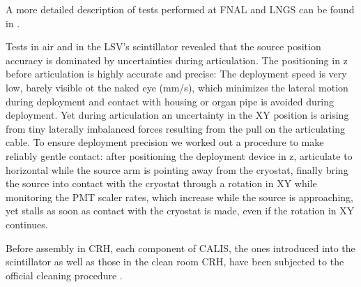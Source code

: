 A more detailed description of tests performed at FNAL and LNGS can be found in \cite{thesis:Hackett, thesis:Edkins}.

Tests in air and in the LSV's scintillator revealed that the source position accuracy is dominated by uncertainties during articulation. The positioning in z before articulation is highly accurate and precise: The deployment speed is very low, barely visible ot the naked eye (mm/s), which minimizes the lateral motion during deployment and contact with housing or organ pipe is avoided during deployment. Yet during articulation an uncertainty in the XY position is arising from tiny laterally imbalanced forces resulting from the pull on the articulating cable. To ensure deployment precision we worked out a procedure to make reliably gentle contact: 
after positioning the deployment device in z, articulate to horizontal while the source arm is pointing away from the cryostat, finally bring the source into contact with the cryostat through a rotation in XY while monitoring the PMT scaler rates, which increase while the source is approaching, yet stalls as soon as contact with the cryostat is made, even if the rotation in XY continues.



Before assembly in CRH, each component of CALIS, the ones introduced into the scintillator as well as those in the clean room CRH, have been subjected to the official cleaning procedure \cite{DS50:cleaning}. 